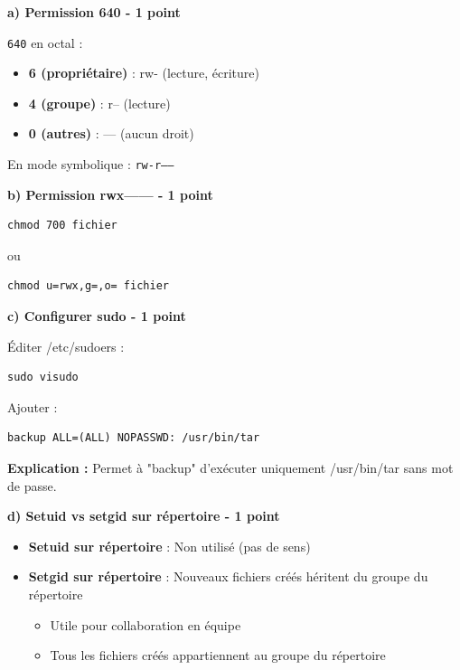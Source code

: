 \documentclass[12pt,a4paper]{article}
\begin{document}
\begin{answerbox}
\textbf{a) Permission 640 - 1 point}

\texttt{640} en octal :
\begin{itemize}
    \item \textbf{6 (propriétaire)} : rw- (lecture, écriture)
    \item \textbf{4 (groupe)} : r-- (lecture)
    \item \textbf{0 (autres)} : --- (aucun droit)
\end{itemize}

En mode symbolique : \texttt{rw-r-----}

\textbf{b) Permission rwx------ - 1 point}
\begin{lstlisting}
chmod 700 fichier
\end{lstlisting}

ou

\begin{lstlisting}
chmod u=rwx,g=,o= fichier
\end{lstlisting}

\textbf{c) Configurer sudo - 1 point}

Éditer /etc/sudoers :
\begin{lstlisting}
sudo visudo
\end{lstlisting}

Ajouter :
\begin{verbatim}
backup ALL=(ALL) NOPASSWD: /usr/bin/tar
\end{verbatim}

\textbf{Explication :} Permet à "backup" d'exécuter uniquement /usr/bin/tar sans mot de passe.

\textbf{d) Setuid vs setgid sur répertoire - 1 point}

\begin{itemize}
    \item \textbf{Setuid sur répertoire} : Non utilisé (pas de sens)
    \item \textbf{Setgid sur répertoire} : Nouveaux fichiers créés héritent du groupe du répertoire
    \begin{itemize}
        \item Utile pour collaboration en équipe
        \item Tous les fichiers créés appartiennent au groupe du répertoire
    \end{itemize}
\end{itemize}
\end{answerbox}

\newpage
\end{document}
